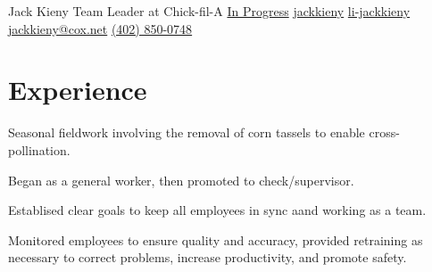 \documentclass[]{latex/resume}
\begin{document}
%
%

\namesection
    {Jack}
    {Kieny}
    {Team Leader at Chick-fil-A}
    {\contactline
        {\href{}{In Progress}}
        {\href{https://www.github.com/jackkieny}{jackkieny}}
        {\href{https://www.linkedin.com/in/jackkieny}{li-jackkieny}}
        {\href{mailto:first.last@mail.com}{jackkieny@cox.net}}
        {\href{tel:+1402850047}{(402) 850-0748}}
    }

%
%

\begin{minipage}[t]{0.70\textwidth} 


\section{Experience}
     
    \vspace{\topsep} %
    \begin{tightemize}
        \sectionsep
            \item 
            \item 
            \item 
    \end{tightemize}
    
    \sectionsep

     
    \begin{tightemize}
        \sectionsep
            \item Seasonal fieldwork involving the removal of corn tassels to enable cross-pollination.
            \item Began as a general worker, then promoted to check/supervisor.
            \item Establised clear goals to keep all employees in sync aand working as a team.
            \item Monitored employees to ensure quality and accuracy, provided retraining as necessary to correct problems, increase productivity, and promote safety.
    \end{tightemize}
    

\end{minipage}
\end{document}
